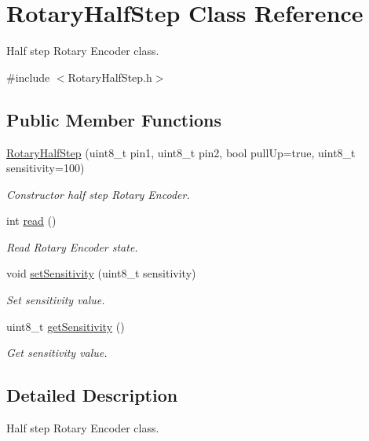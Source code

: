 \hypertarget{class_rotary_half_step}{}\section{Rotary\+Half\+Step Class Reference}
\label{class_rotary_half_step}


Half step Rotary Encoder class.  




{\ttfamily \#include $<$Rotary\+Half\+Step.\+h$>$}

\subsection*{Public Member Functions}
\begin{DoxyCompactItemize}
\item 
\hyperlink{class_rotary_half_step_acef309ba254f737c5e757f77a4a3d86f}{Rotary\+Half\+Step} (uint8\+\_\+t pin1, uint8\+\_\+t pin2, bool pull\+Up=true, uint8\+\_\+t sensitivity=100)
\begin{DoxyCompactList}\small\item\em Constructor half step Rotary Encoder. \end{DoxyCompactList}\item 
int \hyperlink{class_rotary_half_step_ad32ff93a4ee0aaea284b96209eaac485}{read} ()
\begin{DoxyCompactList}\small\item\em Read Rotary Encoder state. \end{DoxyCompactList}\item 
void \hyperlink{class_rotary_half_step_a9189f6298bd4df310db6859fdcf3041e}{set\+Sensitivity} (uint8\+\_\+t sensitivity)
\begin{DoxyCompactList}\small\item\em Set sensitivity value. \end{DoxyCompactList}\item 
uint8\+\_\+t \hyperlink{class_rotary_half_step_a989c6e9bb27d656c97814ff3e542ba12}{get\+Sensitivity} ()
\begin{DoxyCompactList}\small\item\em Get sensitivity value. \end{DoxyCompactList}\end{DoxyCompactItemize}


\subsection{Detailed Description}
Half step Rotary Encoder class. 

